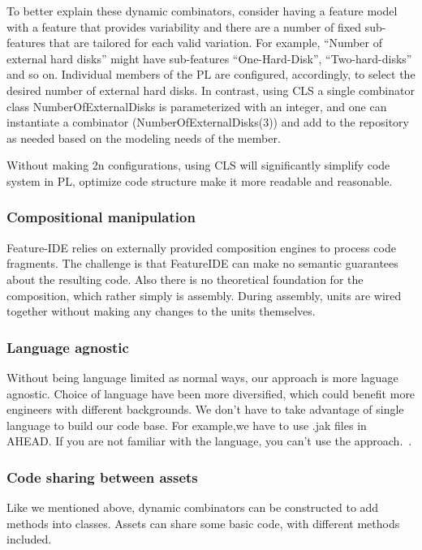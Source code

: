 To better explain these dynamic combinators, consider having a feature
model with a feature that provides variability and there are a number of
fixed sub-features that are tailored for each valid variation. For
example, “Number of external hard disks” might have sub-features
“One-Hard-Disk”, “Two-hard-disks” and so on. Individual members of the
PL are configured, accordingly, to select the desired number of external
hard disks. In contrast, using CLS a single combinator class
NumberOfExternalDisks is parameterized with an integer, and one can
instantiate a combinator (NumberOfExternalDisks(3)) and add to the
repository as needed based on the modeling needs of the member.

Without making 2n configurations, using CLS will significantly simplify
code system in PL, optimize code structure make it more readable and
reasonable.


\subsubsection{Compositional manipulation}

Feature-IDE relies on externally provided composition engines to process
code fragments. The challenge is that FeatureIDE can make no semantic
guarantees about the resulting code. Also there is no theoretical
foundation for the composition, which rather simply is assembly. During
assembly, units are wired together without making any changes to the
units themselves.

\subsubsection{Language agnostic}


Without being language limited as normal ways, our approach is more
laguage agnostic. Choice of language have been more diversified, which
could benefit more engineers with different backgrounds. We don't have
to take advantage of single language to build our code base. For
example,we have to use .jak files in AHEAD. If you are not familiar with
the language, you can't use the approach.~\cite{PEPM18}.

\subsubsection{Code sharing between assets}


Like we mentioned above, dynamic combinators can be constructed to add
methods into classes. Assets can share some basic code, with different
methods included.
